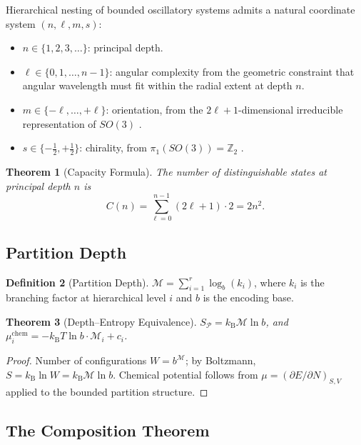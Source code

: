 \documentclass[twocolumn,10pt,a4paper]{article}
\newtheorem{theorem}{Theorem}[section]
\theoremstyle{definition}
\newtheorem{definition}[theorem]{Definition}
\theoremstyle{remark}
\newcommand{\kB}{k_{\mathrm{B}}}
\newcommand{\Depth}{\mathcal{M}}
\newcommand{\Partition}{\mathcal{P}}
\begin{document}
Hierarchical nesting of bounded oscillatory systems admits a natural coordinate system $(n,\ell,m,s)$:
\begin{itemize}[leftmargin=*,nosep]
    \item $n\in\{1,2,3,\ldots\}$: principal depth.
    \item $\ell\in\{0,1,\ldots,n-1\}$: angular complexity from the geometric constraint that angular wavelength must fit within the radial extent at depth $n$.
    \item $m\in\{-\ell,\ldots,+\ell\}$: orientation, from the $2\ell+1$-dimensional irreducible representation of $SO(3)$ \citep{hall2015,hamermesh1962}.
    \item $s\in\{-\tfrac{1}{2},+\tfrac{1}{2}\}$: chirality, from $\pi_1(SO(3)) = \mathbb{Z}_2$ \citep{nakahara2003}.
\end{itemize}

\begin{theorem}[Capacity Formula]
The number of distinguishable states at principal depth $n$ is
\begin{equation}
    C(n) = \sum_{\ell=0}^{n-1}(2\ell+1)\cdot 2 = 2n^2.
    \label{eq:capacity}
\end{equation}
\end{theorem}

\subsection{Partition Depth}

\begin{definition}[Partition Depth]
$\Depth = \sum_{i=1}^{r}\log_b(k_i)$, where $k_i$ is the branching factor at hierarchical level $i$ and $b$ is the encoding base.
\end{definition}

\begin{theorem}[Depth--Entropy Equivalence]
$S_\Partition = \kB\Depth\ln b$, and $\mu_i^{\mathrm{chem}} = -\kB T\ln b\cdot\Depth_i + c_i$.
\end{theorem}

\begin{proof}
Number of configurations $W = b^\Depth$; by Boltzmann, $S = \kB\ln W = \kB\Depth\ln b$. Chemical potential follows from $\mu = (\partial E/\partial N)_{S,V}$ applied to the bounded partition structure.
\end{proof}

\subsection{The Composition Theorem}
\end{document}
